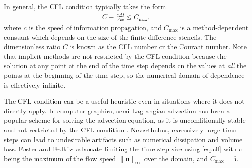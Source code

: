 In general, the CFL condition typically takes the form
\begin{align}
  \label{eq:cfl}
  C \equiv \frac{c\Delta t}{\Delta x} \le C_{\max},
\end{align}
where $c$ is the speed of information propagation, and $C_{\max}$ is a method-dependent constant which depends on the size of the finite-difference stencils.
The dimensionless ratio $C$ is known as the CFL number or the Courant number.
Note that implicit methods are not restricted by the CFL condition because the solution at any point at the end of the time step depends on the values at \emph{all} the points at the beginning of the time step, so the numerical domain of dependence is effectively infinite.

The CFL condition can be a useful heuristic even in situations where it does not directly apply.
In computer graphics, semi-Lagrangian advection \cite{Stam1999} has been a popular scheme for solving the advection equation, as it is unconditionally stable and not restricted by the CFL condition \cite{Bridson2008}.
Nevertheless, excessively large time steps can lead to undesirable artifacts such as numerical dissipation and volume loss.
Foster and Fedkiw \cite{Foster2001} advocate limiting the time step size using \eqref{eq:cfl} with $c$ being the maximum of the flow speed $\|\mathbf u\|_\infty$ over the domain, and $C_{\max} = 5$.

